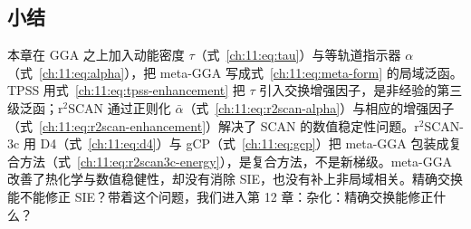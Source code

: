 \subsection*{小结}
本章在 GGA 之上加入动能密度 $\tau$（式~\eqref{ch:11:eq:tau}）与等轨道指示器 $\alpha$（式~\eqref{ch:11:eq:alpha}），把 meta-GGA 写成式~\eqref{ch:11:eq:meta-form} 的局域泛函。TPSS 用式~\eqref{ch:11:eq:tpss-enhancement} 把 $\tau$ 引入交换增强因子，是非经验的第三级泛函；r$^2$SCAN 通过正则化 $\bar{\alpha}$（式~\eqref{ch:11:eq:r2scan-alpha}）与相应的增强因子（式~\eqref{ch:11:eq:r2scan-enhancement}）解决了 SCAN 的数值稳定性问题。r$^2$SCAN-3c 用 D4（式~\eqref{ch:11:eq:d4}）与 gCP（式~\eqref{ch:11:eq:gcp}）把 meta-GGA 包装成复合方法（式~\eqref{ch:11:eq:r2scan3c-energy}），是复合方法，不是新梯级。meta-GGA 改善了热化学与数值稳健性，却没有消除 SIE，也没有补上非局域相关。精确交换能不能修正 SIE？带着这个问题，我们进入第 12 章：杂化：精确交换能修正什么？
